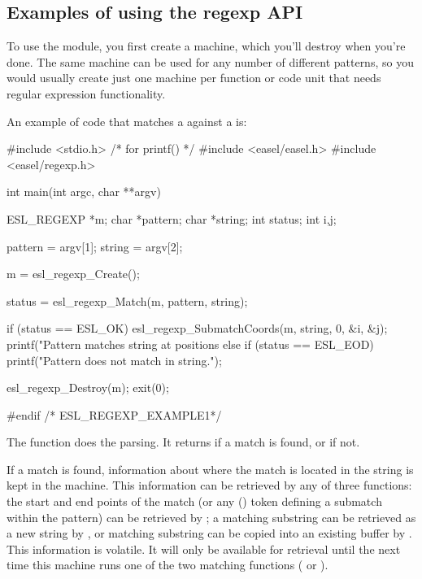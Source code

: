 \subsection{Examples of using the regexp API}

To use the  module, you first create a machine, which
you'll destroy when you're done. The same machine can be used for any
number of different patterns, so you would usually create just one
machine per function or code unit that needs regular expression
functionality.

An example of code that matches a  against a
 is:

\begin{cchunk}
#include <stdio.h> /* for printf() */
#include <easel/easel.h>
#include <easel/regexp.h>

int
main(int argc, char **argv)
{
  ESL_REGEXP *m;  
  char       *pattern;
  char       *string;
  int         status;
  int         i,j;

  pattern = argv[1];
  string  = argv[2];

  m = esl_regexp_Create();

  status = esl_regexp_Match(m, pattern, string);

  if (status == ESL_OK) 
    {
      esl_regexp_SubmatchCoords(m, string, 0, &i, &j);
      printf("Pattern matches string at positions %
    }
  else if (status == ESL_EOD)
    {
      printf("Pattern does not match in string.\n");
    }

  esl_regexp_Destroy(m);
  exit(0);
}
#endif /* ESL_REGEXP_EXAMPLE1*/
\end{cchunk}


The  function does the parsing. It returns
 if a match is found, or  if not. 

If a match is found, information about where the match is located in
the string is kept in the machine. This information can be retrieved
by any of three functions: the start and end points of the match (or
any () token defining a submatch within the pattern) can be retrieved
by ; a matching substring can be
retrieved as a new string by , or
matching substring can be copied into an existing buffer by
. This information is volatile. It
will only be available for retrieval until the next time this machine
runs one of the two matching functions ( or
).

